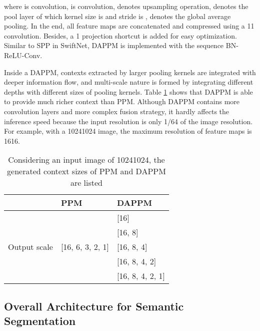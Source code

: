 \documentclass[journal]{IEEEtran}
\begin{document}
where  is  convolution,  is  convolution,  denotes upsampling operation,  denotes the pool layer of which kernel size is  and stride is ,  denotes the global average pooling.
In the end, all feature maps are concatenated and compressed using a 11 convolution. Besides, a 1 projection shortcut is added for easy optimization. Similar to SPP in SwiftNet\cite{orsic2019defense}, DAPPM is implemented with the sequence BN-ReLU-Conv.

Inside a DAPPM, contexts extracted by larger pooling kernels are integrated with deeper information flow, and multi-scale nature is formed by integrating different depths with different sizes of pooling kernels. Table \ref{tab:6} shows that DAPPM is able to provide much richer context than PPM. Although DAPPM contains more convolution layers and more complex fusion strategy, it hardly affects the inference speed because the input resolution is only 1/64 of the image resolution. For example, with a 10241024 image, the maximum resolution of feature maps is 1616.

\begin{table}[]
\caption{Considering an input image of 10241024, the generated context sizes of PPM and DAPPM are listed}
\label{tab:6}
\begin{tabular}{p{50pt}p{82pt}<{\centering}p{82pt}<{\centering}}
\toprule
                              & PPM                               & DAPPM  \\ \midrule
\multirow{5}{*}{Output scale} & \multirow{5}{*}{[16, 6, 3, 2, 1]} & [16] \\
                              &                                   & [16, 8] \\
                              &                                   & [16, 8, 4] \\
                              &                                   & [16, 8, 4, 2] \\
                              &                                   & [16, 8, 4, 2, 1] \\ \bottomrule
\end{tabular}
\end{table}

\subsection{Overall Architecture for Semantic Segmentation}
\end{document}
